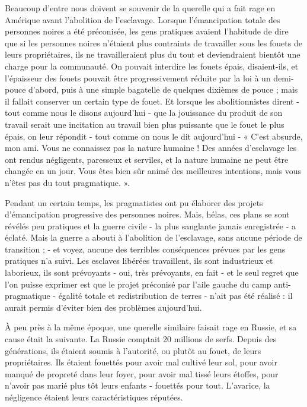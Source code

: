 Beaucoup d'entre nous doivent se souvenir de la querelle qui a fait rage en Amérique avant l'abolition de l'esclavage. Lorsque l'émancipation totale des personnes noires a été préconisée, les gens pratiques avaient l'habitude de dire que si les personnes noires n'étaient plus contraints de travailler sous les fouets de leurs propriétaires, ils ne travailleraient plus du tout et deviendraient bientôt une charge pour la communauté. On pouvait interdire les fouets épais, disaient-ils, et l'épaisseur des fouets pouvait être progressivement réduite par la loi à un demi-pouce d'abord, puis à une simple bagatelle de quelques dixièmes de pouce ; mais il fallait conserver un certain type de fouet. Et lorsque les abolitionnistes dirent - tout comme nous le disons aujourd'hui - que la jouissance du produit de son travail serait une incitation au travail bien plus puissante que le fouet le plus épais, on leur répondit - tout comme on nous le dit aujourd'hui - « C'est absurde, mon ami. Vous ne connaissez pas la nature humaine ! Des années d'esclavage les ont rendus négligents, paresseux et serviles, et la nature humaine ne peut être changée en un jour. Vous êtes bien sûr animé des meilleures intentions, mais vous n'êtes pas du tout pragmatique. ».

Pendant un certain temps, les pragmatistes ont pu élaborer des projets d'émancipation progressive des personnes noires. Mais, hélas, ces plans se sont révélés peu pratiques et la guerre civile - la plus sanglante jamais enregistrée - a éclaté. Mais la guerre a abouti à l'abolition de l'esclavage, sans aucune période de transition ; - et voyez, aucune des terribles conséquences prévues par les gens pratiques n'a suivi. Les esclaves libérées travaillent, ils sont industrieux et laborieux, ils sont prévoyants - oui, très prévoyants, en fait - et le seul regret que l'on puisse exprimer est que le projet préconisé par l'aile gauche du camp anti-pragmatique - égalité totale et redistribution de terres - n'ait pas été réalisé : il aurait permis d'éviter bien des problèmes aujourd'hui.

À peu près à la même époque, une querelle similaire faisait rage en Russie, et sa cause était la suivante. La Russie comptait 20 millions de serfs. Depuis des générations, ils étaient soumis à l'autorité, ou plutôt au fouet, de leurs propriétaires. Ils étaient fouettés pour avoir mal cultivé leur sol, pour avoir manqué de propreté dans leur foyer, pour avoir mal tissé leurs étoffes, pour n'avoir pas marié plus tôt leurs enfants - fouettés pour tout. L'avarice, la négligence étaient leurs caractéristiques réputées.

